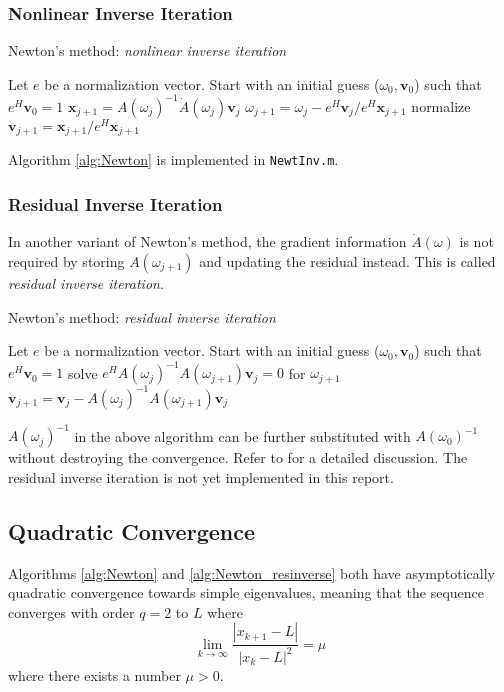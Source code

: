 \documentclass[final,leqno,onefignum,onetabnum]{siamltex1213}
\begin{document}
\subsubsection{Nonlinear Inverse Iteration}
\begin{algorithm}
\caption{Newton's method: {\it nonlinear inverse iteration}}
\label{alg:Newton}
\begin{algorithmic}
\STATE Let $e$ be a normalization vector. Start with an initial guess ($\omega_0, \mathbf{v}_0$) such that $e^{H}\mathbf{v}_0=1$ 
\STATE $\mathbf{x}_{j+1} = A(\omega_j)^{-1} \dot{A}(\omega_j)\mathbf{v}_j$
\STATE $\omega_{j+1} = \omega_j - e^H\mathbf{v}_j/e^H\mathbf{x}_{j+1} $
\STATE normalize $\mathbf{v}_{j+1}=\mathbf{x}_{j+1}/e^{H}\mathbf{x}_{j+1}$
\ENDFOR
\end{algorithmic}
\end{algorithm}
Algorithm \ref{alg:Newton} is implemented in {\tt NewtInv.m}. 
\subsubsection{Residual Inverse Iteration}
In another variant of Newton's method, the gradient information $\dot{A}(\omega)$ is not required by storing $A(\omega_{j+1})$ and updating the residual instead. This is called  {\it residual inverse iteration}. \citep{neumaier1985residual}

\begin{algorithm}
\caption{Newton's method: {\it residual inverse iteration}}
\label{alg:Newton_resinverse}
\begin{algorithmic}
\STATE Let $e$ be a normalization vector. Start with an initial guess ($\omega_0, \mathbf{v}_0$) such that $e^{H}\mathbf{v}_0=1$ 
\STATE solve $e^H A(\omega_j)^{-1} A(\omega_{j+1})\mathbf{v}_j =0 $ for $\omega_{j+1}$ 
\STATE $\mathbf{v}_{j+1} = \mathbf{v}_j- A(\omega_j)^{-1} A(\omega_{j+1})\mathbf{v}_j $
\ENDFOR
\end{algorithmic}
\end{algorithm}
$A(\omega_j)^{-1}$ in the above algorithm can be further substituted with $A(\omega_0)^{-1}$  without destroying the convergence. Refer to \citep{neumaier1985residual} for a detailed discussion. The residual inverse iteration is not yet implemented in this report. 

\subsection{Quadratic Convergence}
Algorithms \ref{alg:Newton} and \ref{alg:Newton_resinverse} both 
have asymptotically quadratic convergence towards simple eigenvalues, meaning that the sequence converges with order $q=2$ to $L$ where 
\begin{equation}\label{eq:quadconv}
    \lim_{k \to \infty} \frac{|x_{k+1}-L|}{|x_k-L|^{2}} = \mu 
\end{equation}
where there exists a number $\mu>0$.
\end{document}
